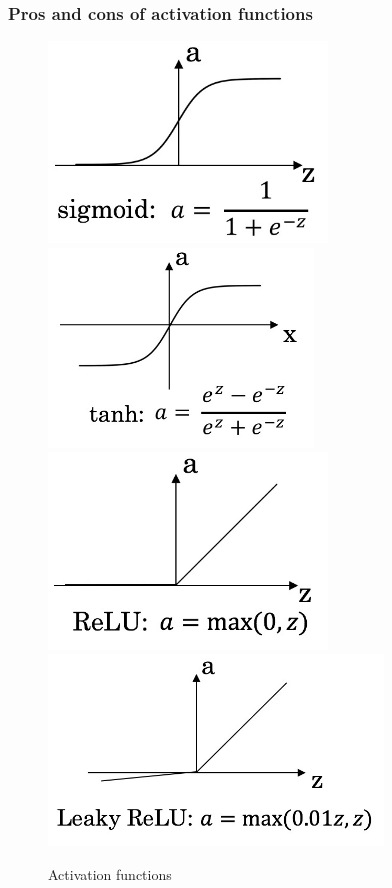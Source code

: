 \documentclass[UTF8]{article}
\begin{document}
\subsubsection{Pros and cons of activation functions}
\begin{figure}[htb]
    \centering
    \includegraphics[width=20em]{figures/sigmoid-black} \qquad
    \includegraphics[width=19em]{figures/tanh} \\
    \includegraphics[width=20em]{figures/relu} \quad
    \includegraphics[width=24em]{figures/leaky-relu}
    \caption{Activation functions}
\end{figure}
\end{document}
